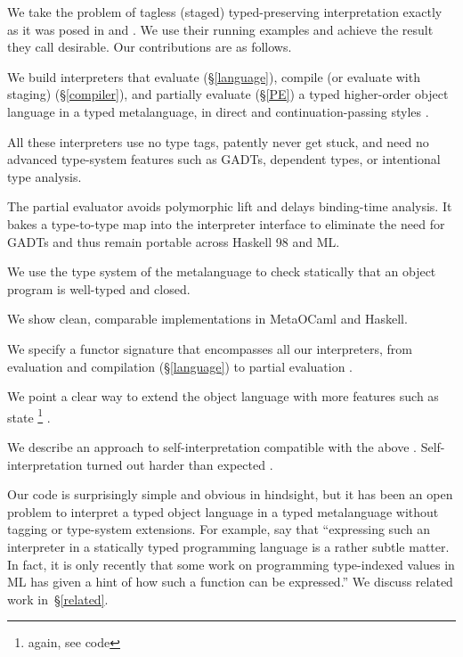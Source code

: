 We take the problem of tagless (staged) typed-preserving
interpretation exactly as it was posed in \cite{WalidICFP02} and
\cite{xi-guarded}.  We use their running examples and achieve the
result they call desirable.  Our contributions are as follows.

\begin{enumerate*}
\item We build interpreters that evaluate (\S\ref{language}),
    compile (or evaluate with staging) (\S\ref{compiler}), and partially evaluate (\S\ref{PE}) a typed higher-order object language
   in a typed metalanguage, in direct and continuation\hyp passing styles%
.
\item All these interpreters use no type tags, patently never get stuck,
    and need no advanced type-system features such as GADTs, dependent types,
    or intentional type analysis.
\item The partial evaluator avoids polymorphic lift and delays binding-time
    analysis.  It bakes a type-to-type map into the interpreter
    interface to eliminate the need for GADTs and thus remain portable
    across Haskell 98 and ML.
\item We use the type system of the metalanguage
    to check statically that an object program is well-typed and closed.
\item We show clean, comparable implementations in MetaOCaml and Haskell.
\item We specify a functor signature that encompasses all our
  interpreters, from evaluation and compilation (\S\ref{language}) 
   to partial evaluation%
.
\item We point a clear way to extend the object language with more features
    such as state%
\footnote{again, see code}
.
\item We describe an approach to self\hyp interpretation compatible with the
  above%
.  Self\hyp interpretation turned out
  harder than expected%
\footnotemark[\value{footnote}]
.
\end{enumerate*}
Our code is surprisingly simple and obvious in hindsight, but
it has been an open problem to
interpret a typed object language in a typed metalanguage without
tagging or type\hyp system extensions.  For example, \citet{taha-tag}
say that ``expressing such an interpreter in a statically typed
programming language is a rather subtle matter. In fact, it is only
recently that some work on programming type-indexed values in ML
\cite{yang-encoding} has given a hint of how such a function can be
expressed.''  We discuss related work in~\S\ref{related}.


